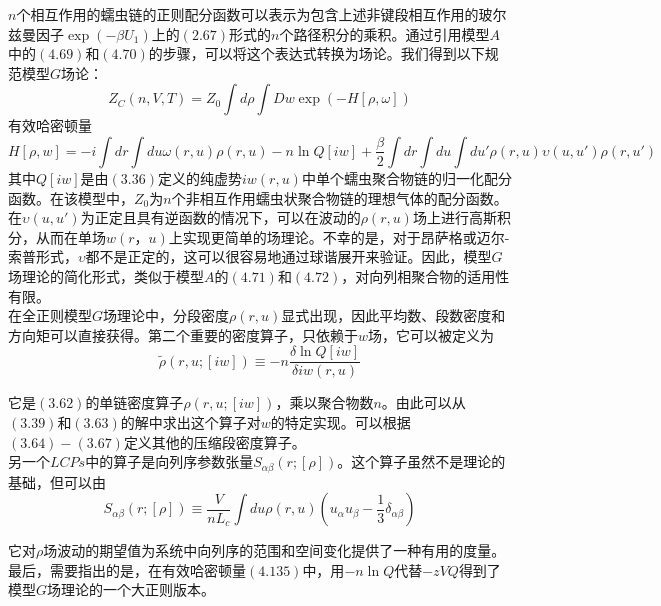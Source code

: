 $n$个相互作用的蠕虫链的正则配分函数可以表示为包含上述非键段相互作用的玻尔兹曼因子$\exp (-\beta U_1)$上的$(2.67)$形式的$n$个路径积分的乘积。通过引用模型$A$中的$(4.69)$和$(4.70)$的步骤，可以将这个表达式转换为场论。我们得到以下规范模型$G$场论：\\
\begin{equation}
Z_{C}(n,V,T)=Z_{0} \int d \rho \int D w \exp (-H[\rho,\omega])
\end{equation}
有效哈密顿量\\ 
\begin{equation}
H[\rho,w]= -i \int dr \int du \omega(r,u) \rho(r,u)-n \ln Q[i w]+\frac{\beta}{2} \int dr \int du \int du' \rho(r,u) \upsilon(u,u') \rho(r,u')
\end{equation}
其中$Q[i w]$是由$(3.36)$定义的纯虚势$i w(r,u)$中单个蠕虫聚合物链的归一化配分函数。在该模型中，$Z_0$为$n$个非相互作用蠕虫状聚合物链的理想气体的配分函数。\\

在$\upsilon(u,u')$为正定且具有逆函数的情况下，可以在波动的$\rho(r,u)$场上进行高斯积分，从而在单场$w(r，u)$上实现更简单的场理论。不幸的是，对于昂萨格或迈尔-索普形式，$\upsilon$都不是正定的，这可以很容易地通过球谐展开来验证。因此，模型$G$场理论的简化形式，类似于模型$A$的$(4.71)$和$(4.72)$，对向列相聚合物的适用性有限。\\

在全正则模型$G$场理论中，分段密度$\rho(r,u)$显式出现，因此平均数、段数密度和方向矩可以直接获得。第二个重要的密度算子，只依赖于$w$场，它可以被定义为\\
\begin{equation}
\tilde{\rho}(r,u;[i w]) \equiv -n \frac{\delta \ln Q[i w]}{\delta i w(r,u)}
\end{equation}

它是$(3.62)$的单链密度算子$\rho(r,u;[i w])$，乘以聚合物数$n$。由此可以从$(3.39)$和$(3.63)$的解中求出这个算子对$w$的特定实现。可以根据$(3.64)-(3.67)$定义其他的压缩段密度算子。\\

另一个$LCPs$中的算子是向列序参数张量$S_{\alpha \beta}(r;[\rho])$。这个算子虽然不是理论的基础，但可以由\\
\begin{equation}
S_{\alpha \beta}(r;[\rho]) \equiv \frac{V}{n L_{c}} \int du \rho(r,u)(u_{\alpha} u_{\beta}-\frac{1}{3} \delta_{\alpha \beta})
\end{equation}

它对$\rho$场波动的期望值为系统中向列序的范围和空间变化提供了一种有用的度量。最后，需要指出的是，在有效哈密顿量$(4.135)$中，用$-n \ln Q$代替$-z VQ$得到了模型$G$场理论的一个大正则版本。\\